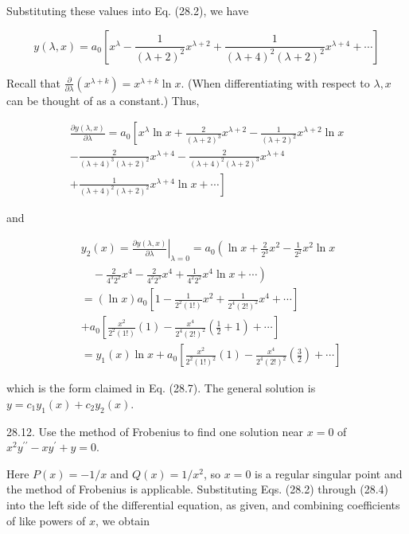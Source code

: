 \documentclass[10pt]{article}
\begin{document}
Substituting these values into Eq. (28.2), we have

$$
y(\lambda, x)=a_{0}\left[x^{\lambda}-\frac{1}{(\lambda+2)^{2}} x^{\lambda+2}+\frac{1}{(\lambda+4)^{2}(\lambda+2)^{2}} x^{\lambda+4}+\cdots\right]
$$

Recall that $\frac{\partial}{\partial \lambda}\left(x^{\lambda+k}\right)=x^{\lambda+k} \ln x$. (When differentiating with respect to $\lambda, x$ can be thought of as a constant.) Thus,

$$
\begin{gathered}
\frac{\partial y(\lambda, x)}{\partial \lambda}=a_{0}\left[x^{\lambda} \ln x+\frac{2}{(\lambda+2)^{3}} x^{\lambda+2}-\frac{1}{(\lambda+2)^{2}} x^{\lambda+2} \ln x\right. \\
-\frac{2}{(\lambda+4)^{3}(\lambda+2)^{2}} x^{\lambda+4}-\frac{2}{(\lambda+4)^{2}(\lambda+2)^{3}} x^{\lambda+4} \\
\left.+\frac{1}{(\lambda+4)^{2}(\lambda+2)^{2}} x^{\lambda+4} \ln x+\cdots\right]
\end{gathered}
$$

and


\begin{align*}
& y_{2}(x)=\left.\frac{\partial y(\lambda, x)}{\partial \lambda}\right|_{\lambda=0}= a_{0}\left(\ln x+\frac{2}{2^{3}} x^{2}-\frac{1}{2^{2}} x^{2} \ln x\right. \\
&\left.\quad-\frac{2}{4^{3} 2^{2}} x^{4}-\frac{2}{4^{2} 2^{3}} x^{4}+\frac{1}{4^{2} 2^{2}} x^{4} \ln x+\cdots\right) \\
&=(\ln x) a_{0}\left[1-\frac{1}{2^{2}(1 !)} x^{2}+\frac{1}{2^{4}(2 !)^{2}} x^{4}+\cdots\right] \\
&+a_{0}\left[\frac{x^{2}}{2^{2}(1 !)}(1)-\frac{x^{4}}{2^{4}(2 !)^{2}}\left(\frac{1}{2}+1\right)+\cdots\right] \\
&= y_{1}(x) \ln x+a_{0}\left[\frac{x^{2}}{2^{2}(1 !)^{2}}(1)-\frac{x^{4}}{2^{4}(2 !)^{2}}\left(\frac{3}{2}\right)+\cdots\right] \tag{1}
\end{align*}


which is the form claimed in Eq. (28.7). The general solution is $y=c_{1} y_{1}(x)+c_{2} y_{2}(x)$.

28.12. Use the method of Frobenius to find one solution near $x=0$ of $x^{2} y^{\prime \prime}-x y^{\prime}+y=0$.

Here $P(x)=-1 / x$ and $Q(x)=1 / x^{2}$, so $x=0$ is a regular singular point and the method of Frobenius is applicable. Substituting Eqs. (28.2) through (28.4) into the left side of the differential equation, as given, and combining coefficients of like powers of $x$, we obtain
\end{document}
